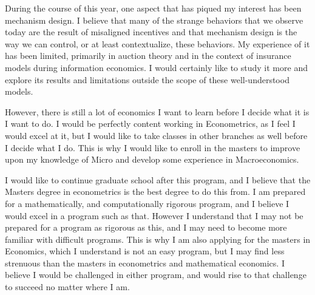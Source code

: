 \documentclass[10pt, a4paper]{article}
\begin{document}
During the course of this year, one aspect that has piqued my interest
has been mechanism design. I believe that many of the strange
behaviors that we observe today are the result of misaligned
incentives and that mechanism design is the way we can control, or at
least contextualize, these behaviors. My experience of it has been
limited, primarily in auction theory and in the context of insurance
models during information economics. I would certainly like to study it
more and explore its results and limitations outside the scope of
these well-understood models.

However, there is still a lot of economics I want to learn before I
decide what it is I want to do. I would be perfectly content working
in Econometrics, as I feel I would excel at it, but I would like to
take classes in other branches as well before I decide what I do. This
is why I would like to enroll in the masters to improve upon my
knowledge of Micro and develop some experience in
Macroeconomics. 

I would like to continue graduate school after this program, and I
believe that the Masters degree in econometrics is the best degree to do
this from. I am prepared for a mathematically, and computationally
rigorous program, and I believe I would excel in a program such as
that. However I understand that I may not be prepared for a program as
rigorous as this, and I may need to become more familiar with
difficult programs. This is why I am also applying for the masters in
Economics, which I understand is not an easy program, but I may find
less strenuous than the masters in econometrics and mathematical
economics. I believe I would be challenged in either program, and
would rise to that challenge to succeed no matter where I am.
\end{document}
